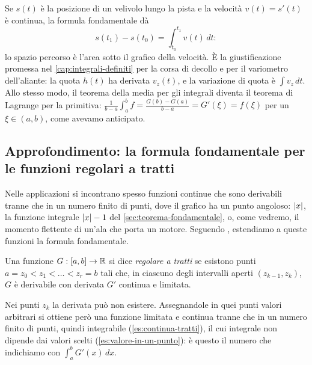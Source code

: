 \begin{idea}
Se $s(t)$ è la posizione di un velivolo lungo la pista e la velocità $v(t)=s'(t)$ è
continua, la formula fondamentale dà
\begin{equation}\label{eq:spazio-velocita}
  s(t_{1})-s(t_{0})=\int_{t_{0}}^{t_{1}}v(t)\,dt :
\end{equation}
lo spazio percorso è l'area sotto il grafico della velocità. È la giustificazione
promessa nel \cref{cap:integrali-definiti} per la corsa di decollo e per il variometro
dell'aliante: la quota $h(t)$ ha derivata $v_{z}(t)$, e la variazione di quota è
$\int v_{z}\,dt$. Allo stesso modo, il teorema della media per gli integrali diventa il
teorema di Lagrange per la primitiva: $\frac1{b-a}\int_{a}^{b}f=\frac{G(b)-G(a)}{b-a}=G'(\xi)=f(\xi)$
per un $\xi\in(a,b)$, come avevamo anticipato.
\end{idea}

\subsection{Approfondimento: la formula fondamentale per le funzioni regolari a tratti}
\label{subsec:regolari-tratti}

Nelle applicazioni si incontrano spesso funzioni continue che sono derivabili tranne che in
un numero finito di punti, dove il grafico ha un punto angoloso: $\lvert x\rvert$, la funzione
integrale $\lvert x\rvert-1$ del \cref{sec:teorema-fondamentale}, o, come vedremo, il momento
flettente di un'ala che porta un motore. Seguendo \cite{giusti}, estendiamo a queste
funzioni la formula fondamentale.

\begin{definizione}\label{def:regolare-tratti}
Una funzione $G:[a,b]\to\mathbb{R}$ si dice \emph{regolare a tratti} se esistono punti
$a=z_{0}<z_{1}<\dots<z_{r}=b$ tali che, in ciascuno degli intervalli aperti
$(z_{k-1},z_{k})$, $G$ è derivabile con derivata $G'$ continua e limitata.
\end{definizione}

Nei punti $z_{k}$ la derivata può non esistere. Assegnandole in quei punti valori
arbitrari si ottiene però una funzione limitata e continua tranne che in un numero finito
di punti, quindi integrabile (\cref{es:continua-tratti}), il cui integrale non dipende dai
valori scelti (\cref{es:valore-in-un-punto}): è questo il numero che indichiamo con
$\int_{a}^{b}G'(x)\,dx$.

